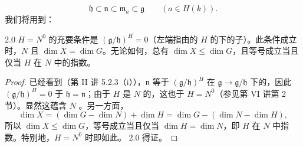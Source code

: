 \[\mathfrak h\subset\mathfrak n\subset\mathfrak m_a\subset\mathfrak g\qquad(a\in H(k)).\]
我们将用到：
\begin{SGAresult}{}{2.0}
$H=N^0$ 的充要条件是 $(\mathfrak g/\mathfrak h)^H=0$（左端指由的 $H$ 的下的子）。此条件成立时，$N$ 且 $\dim X=\dim G$。无论如何，总有 $\dim X\leq\dim G$，且等号成立当且仅当 $H$ 在 $N$ 中的指数。
\end{SGAresult}
\begin{proof}
已经看到（第 II 讲 5.2.3（i）），$\mathfrak n$ 等于 $(\mathfrak g/\mathfrak h)^H$ 在 $\mathfrak g\to\mathfrak g/\mathfrak h$ 下的，因此 $(\mathfrak g/\mathfrak h)^H=0$ 于 $\mathfrak h=\mathfrak n$；由于 $H$ 是 $N$ 的，这也于 $H=N^0$（参见第 VI 讲第 2 节）。显然这蕴含 $N$ 。另一方面，
\[\dim X=(\dim G-\dim N)+\dim H=\dim G-(\dim N-\dim H),\]
所以 $\dim X\leq\dim G$，等号成立当且仅当 $\dim H=\dim N$，即 $H$ 在 $N$ 中指数。特别地，$H=N^0$ 时即如此。 2.0 得证。
\end{proof}
